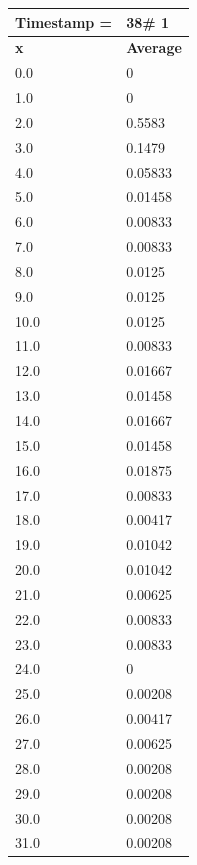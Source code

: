 \begin{tabular}{|l||l|}
\hline
\textbf{Timestamp =} & \textbf{38}\# 1\\\hline
	\textbf{x} & \textbf{Average} \\ \hline
\hline
	0.0 & 0 \\ \hline
	1.0 & 0 \\ \hline
	2.0 & 0.5583 \\ \hline
	3.0 & 0.1479 \\ \hline
	4.0 & 0.05833 \\ \hline
	5.0 & 0.01458 \\ \hline
	6.0 & 0.00833 \\ \hline
	7.0 & 0.00833 \\ \hline
	8.0 & 0.0125 \\ \hline
	9.0 & 0.0125 \\ \hline
	10.0 & 0.0125 \\ \hline
	11.0 & 0.00833 \\ \hline
	12.0 & 0.01667 \\ \hline
	13.0 & 0.01458 \\ \hline
	14.0 & 0.01667 \\ \hline
	15.0 & 0.01458 \\ \hline
	16.0 & 0.01875 \\ \hline
	17.0 & 0.00833 \\ \hline
	18.0 & 0.00417 \\ \hline
	19.0 & 0.01042 \\ \hline
	20.0 & 0.01042 \\ \hline
	21.0 & 0.00625 \\ \hline
	22.0 & 0.00833 \\ \hline
	23.0 & 0.00833 \\ \hline
	24.0 & 0 \\ \hline
	25.0 & 0.00208 \\ \hline
	26.0 & 0.00417 \\ \hline
	27.0 & 0.00625 \\ \hline
	28.0 & 0.00208 \\ \hline
	29.0 & 0.00208 \\ \hline
	30.0 & 0.00208 \\ \hline
	31.0 & 0.00208 \\ \hline
\end{tabular}
